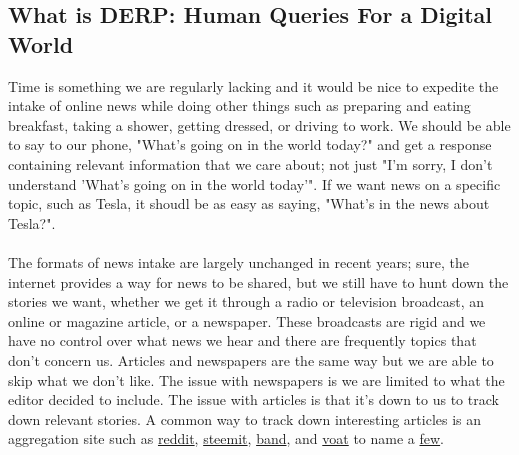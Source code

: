 \documentclass{article}
\begin{document}
\subsection{What is DERP: Human Queries For a Digital World}
Time is something we are regularly lacking and it would be nice to expedite the intake of online news while doing other things such as preparing and eating breakfast, taking a shower, getting dressed, or driving to work. We should be able to say to our phone, "What's going on in the world today?" and get a response containing relevant information that we care about; not just "I'm sorry, I don't understand 'What's going on in the world today'". If we want news on a specific topic, such as Tesla, it shoudl be as easy as saying, "What's in the news about Tesla?". \\ \\
The formats of news intake are largely unchanged in recent years; sure, the internet provides a way for news to be shared, but we still have to hunt down the stories we want, whether we get it through a radio or television broadcast, an online or magazine article, or a newspaper. These broadcasts are rigid and we have no control over what news we hear and there are frequently topics that don't concern us. Articles and newspapers are the same way but we are able to skip what we don't like. The issue with newspapers is we are limited to what the editor decided to include. The issue with articles is that it's down to us to track down relevant stories. A common way to track down interesting articles is an aggregation site such as \href{https://www.reddit.com}{reddit}, \href{https://steemit.com/}{steemit}, \href{https://band.us/home}{band}, and \href{https://voat.co/}{voat} to name a \href{https://www.reddit.com/r/RedditAlternatives/comments/8585ox/list_of_active_reddit_alternatives/}{few}.
\end{document}
